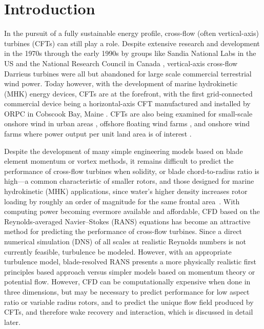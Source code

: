 \documentclass[aip,graphicx]{revtex4-1}
\begin{document}
\pacs{}%

\maketitle %

\section{Introduction}

In the pursuit of a fully sustainable energy profile, cross-flow (often
vertical-axis) turbines (CFTs) can still play a role. Despite extensive research
and development in the 1970s through the early 1990s by groups like Sandia
National Labs in the US \cite{Sutherland2012} and the National Research Council
in Canada \cite{Para2002}, vertical-axis cross-flow Darrieus turbines were all
but abandoned for large scale commercial terrestrial wind power. Today however,
with the development of marine hydrokinetic (MHK) energy devices, CFTs are at
the forefront, with the first grid-connected commercial device being a
horizontal-axis CFT manufactured and installed by ORPC in Cobscook Bay, Maine
\cite{ORPC2012}. CFTs are also being examined for small-scale onshore wind in
urban areas \cite{Lott2015}, offshore floating wind farms \cite{Paulsen2011,
Sandia2012}, and onshore wind farms where power output per unit land area is of
interest \cite{Dabiri2011}.

Despite the development of many simple engineering models based on blade element
momentum or vortex methods, it remains difficult to predict the performance of
cross-flow turbines when solidity, or blade chord-to-radius ratio is high---a
common characteristic of smaller rotors, and those designed for marine
hydrokinetic (MHK) applications, since water's higher density increases rotor
loading by roughly an order of magnitude for the same frontal
area~\cite{Bachant2016-thesis}. With computing power becoming evermore available
and affordable, CFD based on the Reynolds-averaged Navier--Stokes (RANS)
equations has become an attractive method for predicting the performance of
cross-flow turbines. Since a direct numerical simulation (DNS) of all scales at
realistic Reynolds numbers is not currently feasible, turbulence be modeled.
However, with an appropriate turbulence model, blade-resolved RANS presents a
more physically realistic first principles based approach versus simpler models
based on momentum theory or potential flow. However, CFD can be computationally
expensive when done in three dimensions, but may be necessary to predict
performance for low aspect ratio or variable radius rotors, and to predict the
unique flow field produced by CFTs, and therefore wake recovery and interaction,
which is discussed in detail later.
\end{document}
